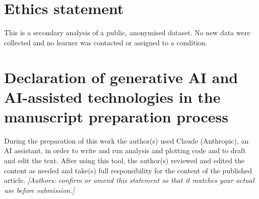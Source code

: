 \documentclass[a4paper,preprint,12pt,authoryear]{elsarticle}
\begin{document}
\section*{Ethics statement}
This is a secondary analysis of a public, anonymised dataset. No new data were collected and no learner was contacted or assigned to a condition.

\section*{Declaration of generative AI and AI-assisted technologies in the manuscript preparation process}
During the preparation of this work the author(s) used Claude (Anthropic), an AI assistant, in order to write and run analysis and plotting code and to draft and edit the text. After using this tool, the author(s) reviewed and edited the content as needed and take(s) full responsibility for the content of the published article. \emph{[Authors: confirm or amend this statement so that it matches your actual use before submission.]}
\end{document}
